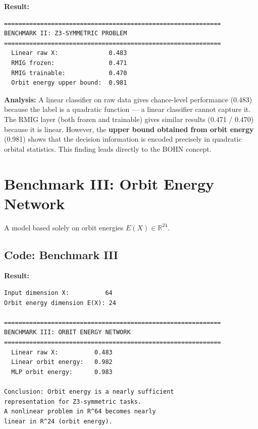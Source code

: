 \documentclass[11pt,a4paper]{report}
\begin{document}
\noindent{}


\textbf{Result:}
\begin{verbatim}
============================================================
BENCHMARK II: Z3-SYMMETRIC PROBLEM
============================================================
  Linear raw X:              0.483
  RMIG frozen:               0.471
  RMIG trainable:            0.470
  Orbit energy upper bound:  0.981
\end{verbatim}

\textbf{Analysis:} A linear classifier on raw data gives chance-level performance (0.483) because the label is a quadratic function --- a linear classifier cannot capture it. The RMIG layer (both frozen and trainable) gives similar results (0.471 / 0.470) because it is linear. However, the \textbf{upper bound obtained from orbit energy} (0.981) shows that the decision information is encoded precisely in quadratic orbital statistics. This finding leads directly to the BOHN concept.


\section{Benchmark III: Orbit Energy Network}

A model based solely on orbit energies $E(X)\in\mathbb{R}^{24}$.

\subsection{Code: Benchmark III}

\noindent{}


\textbf{Result:}
\begin{verbatim}
Input dimension X:          64
Orbit energy dimension E(X): 24

============================================================
BENCHMARK III: ORBIT ENERGY NETWORK
============================================================
  Linear raw X:          0.483
  Linear orbit energy:   0.982
  MLP orbit energy:      0.983

Conclusion: Orbit energy is a nearly sufficient
representation for Z3-symmetric tasks.
A nonlinear problem in R^64 becomes nearly
linear in R^24 (orbit energy).
\end{verbatim}
\end{document}
